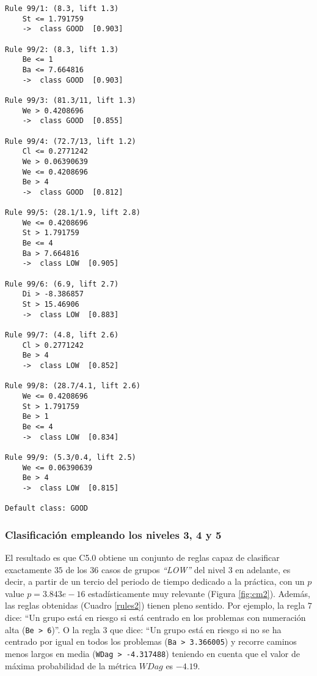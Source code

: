 \begin{tcolorbox}[title=Reglas de clasificación para identificar grupos de tipo \emph{``LOW''}.]
  \makeatletter
  \makeatother
  
 \label{rules3}  
  
\begin{multicols}{2}
    \begin{verbatim}
Rule 99/1: (8.3, lift 1.3)
	St <= 1.791759
	->  class GOOD  [0.903]

Rule 99/2: (8.3, lift 1.3)
	Be <= 1
	Ba <= 7.664816
	->  class GOOD  [0.903]

Rule 99/3: (81.3/11, lift 1.3)
	We > 0.4208696
	->  class GOOD  [0.855]

Rule 99/4: (72.7/13, lift 1.2)
	Cl <= 0.2771242
	We > 0.06390639
	We <= 0.4208696
	Be > 4
	->  class GOOD  [0.812]

Rule 99/5: (28.1/1.9, lift 2.8)
	We <= 0.4208696
	St > 1.791759
	Be <= 4
	Ba > 7.664816
	->  class LOW  [0.905]

Rule 99/6: (6.9, lift 2.7)
	Di > -8.386857
	St > 15.46906
	->  class LOW  [0.883]

Rule 99/7: (4.8, lift 2.6)
	Cl > 0.2771242
	Be > 4
	->  class LOW  [0.852]

Rule 99/8: (28.7/4.1, lift 2.6)
	We <= 0.4208696
	St > 1.791759
	Be > 1
	Be <= 4
	->  class LOW  [0.834]

Rule 99/9: (5.3/0.4, lift 2.5)
	We <= 0.06390639
	Be > 4
	->  class LOW  [0.815]

Default class: GOOD
    \end{verbatim}
  \end{multicols}
\end{tcolorbox}

\subsubsection{Clasificación empleando los niveles 3, 4 y 5}

El resultado es que C5.0 obtiene un conjunto de reglas capaz de clasificar exactamente $35$ de los $36$ casos de grupos \emph{``LOW''} del nivel $3$ en adelante, es decir, a partir de un tercio del periodo de tiempo dedicado a la práctica, con un $p$ value $p = 3.843e-16$ estadísticamente muy relevante (Figura \ref{fig:cm2}). Además, las reglas obtenidas (Cuadro \ref{rules2}) tienen pleno sentido. Por ejemplo, la regla $7$ dice: ``Un grupo está en riesgo si está centrado en los problemas con numeración alta (\texttt{Be > 6})''. O la regla $3$ que dice: ``Un grupo está en riesgo si no se ha centrado por igual en todos los problemas (\texttt{Ba > 3.366005}) y recorre caminos menos largos en media (\texttt{WDag > -4.317488}) teniendo en cuenta que el valor de máxima probabilidad de la métrica $WDag$ es $-4.19$.

